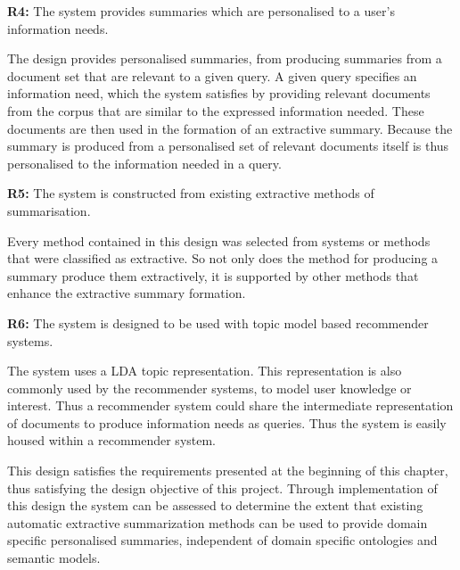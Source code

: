 \textbf{R4:} The system provides summaries which are personalised to a user's information needs.

The design provides personalised summaries, from producing summaries from a document set that are relevant to a given query. A given query specifies an information need, which the system satisfies by providing relevant documents from the corpus that are similar to the expressed information needed. These documents are then used in the formation of an extractive summary. Because the summary is produced from a personalised set of relevant documents itself is thus personalised to the information needed in a query.

\textbf{R5:} The system is constructed from existing extractive methods of summarisation.

Every method contained in this design was selected from systems or methods that were classified as extractive. So not only does the method for producing a summary produce them  extractively, it is supported by other methods that enhance the extractive summary formation. 

\textbf{R6:} The system is designed to be used with topic model based recommender systems.

The system uses a LDA topic representation. This representation is also commonly used by the recommender systems, to model user knowledge or interest. Thus a recommender system could share the intermediate representation of documents to produce information needs as queries. Thus the system is easily housed within a recommender system.

This design satisfies the requirements presented at the beginning of this chapter, thus satisfying the design objective of this project. Through implementation of this design the system can be assessed to determine the extent that existing automatic extractive summarization methods can be used to provide domain specific personalised summaries, independent of domain specific ontologies and semantic models.

